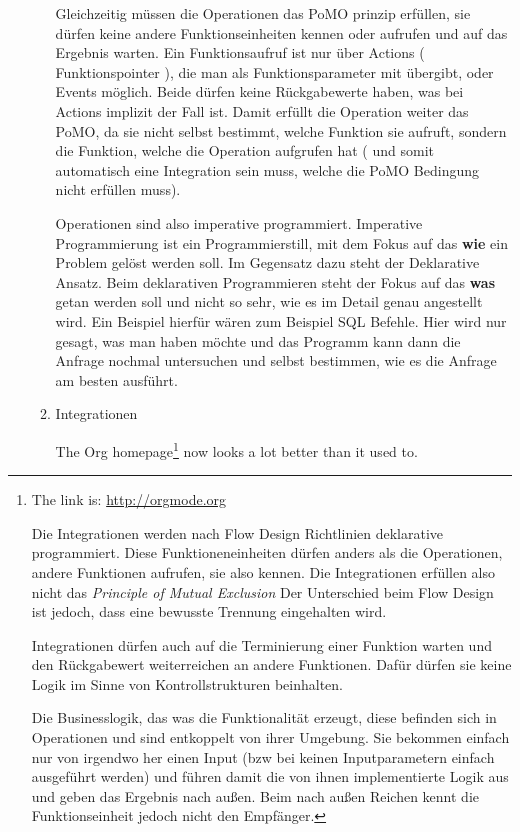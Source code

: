 \documentclass[11pt]{article}
\begin{document}
\begin{enumerate}
\begin{enumerate}
Gleichzeitig müssen die Operationen das PoMO prinzip erfüllen, sie dürfen keine andere Funktionseinheiten kennen oder aufrufen und auf
das Ergebnis warten. 
Ein Funktionsaufruf ist nur über Actions ( Funktionspointer ), die man als Funktionsparameter mit übergibt, oder Events möglich.
Beide dürfen keine Rückgabewerte haben, was bei Actions implizit der Fall ist.
Damit erfüllt die Operation weiter das PoMO, da sie nicht selbst bestimmt, welche Funktion sie aufruft, sondern die Funktion,
welche die Operation aufgrufen hat ( und somit automatisch eine Integration sein muss, welche die PoMO Bedingung nicht erfüllen muss).


Operationen sind also imperative programmiert. Imperative Programmierung ist ein Programmierstill,
mit dem Fokus auf das \textbf{wie} ein Problem gelöst werden soll.
Im Gegensatz dazu steht der Deklarative Ansatz.
Beim deklarativen Programmieren steht der Fokus auf das \textbf{was} getan werden soll und nicht so sehr,
wie es im Detail genau angestellt wird. Ein Beispiel hierfür wären zum Beispiel SQL Befehle.
Hier wird nur gesagt, was man haben möchte und das Programm kann dann die Anfrage nochmal untersuchen
und selbst bestimmen, wie es die Anfrage am besten ausführt.

\item Integrationen
\label{sec:orgheadline21}

The Org homepage\footnote{The link is: \url{http://orgmode.org}

Die Integrationen werden nach Flow Design Richtlinien deklarative programmiert.
Diese Funktioneneinheiten dürfen anders als die Operationen, andere Funktionen aufrufen, sie also kennen.
Die Integrationen erfüllen also nicht das \emph{Principle of Mutual Exclusion}
Der Unterschied beim Flow Design ist jedoch, dass eine bewusste Trennung eingehalten wird.

Integrationen dürfen auch auf die Terminierung einer Funktion warten und den Rückgabewert  weiterreichen an andere Funktionen.
Dafür dürfen sie keine Logik im Sinne von Kontrollstrukturen beinhalten.

Die Businesslogik, das was die Funktionalität erzeugt, diese befinden sich in Operationen und sind entkoppelt von ihrer Umgebung.
Sie bekommen einfach nur von irgendwo her einen Input (bzw bei keinen Inputparametern einfach ausgeführt werden) und führen damit die von ihnen implementierte
Logik aus und geben das Ergebnis nach außen. Beim nach außen Reichen kennt die Funktionseinheit jedoch nicht den Empfänger.} now looks a lot better than it used to.
\end{enumerate}


\end{enumerate}
\end{document}
